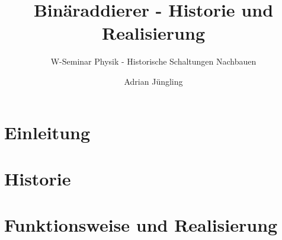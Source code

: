 \documentclass[parskip = half*,numbers=noenddot,12pt]{scrartcl}
\title{Binäraddierer - Historie und Realisierung}
\subtitle{W-Seminar Physik - Historische Schaltungen Nachbauen}
\author{Adrian Jüngling}
\begin{document}
	
	
	\maketitle
	\newpage
	\tableofcontents
	\newpage
	
	\section{Einleitung}
	
	
	\section{Historie}
	
	
	\section{Funktionsweise und Realisierung}
	
	
	\newpage
	
\end{document}
